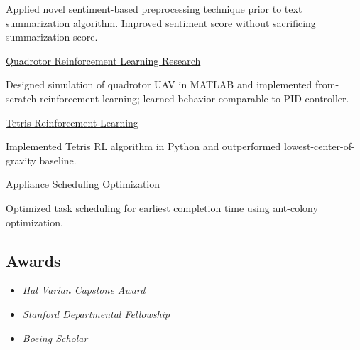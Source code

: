 \documentclass[10pt,letterpaper]{article}
\begin{document}
\begin{paracol}{2}
\begin{leftcolumn}
        \begin{adjustwidth}{2.5em}{}
        Applied novel sentiment-based preprocessing technique prior to text summarization algorithm. Improved sentiment score without sacrificing summarization score.
        \end{adjustwidth}

    \href{https://github.com/mpaluta/Quadrotor-PILCO/blob/QuadrotorPILCO/Quadrotor\%20Reinforcement\%20Learning\%20Research.pdf}{Quadrotor Reinforcement Learning Research}

        \begin{adjustwidth}{2.5em}{}
        Designed simulation of quadrotor UAV in MATLAB and implemented from-scratch reinforcement learning; learned behavior comparable to PID controller.
        \end{adjustwidth}

    \href{https://github.com/mpaluta/Tetris-Reinforcement-Learning/blob/master/Reinforcement\%20Learning\%20for\%20Tetris.pdf}{Tetris Reinforcement Learning}

        \begin{adjustwidth}{2.5em}{}
        Implemented Tetris RL algorithm in Python and outperformed lowest-center-of-gravity baseline.
        \end{adjustwidth}

    \href{https://github.com/mpaluta/Ant-Colony-Optimization/blob/master/Ant\%20Colony\%20Optimization.pdf}{Appliance Scheduling Optimization}

        \begin{adjustwidth}{2.5em}{}
        Optimized task scheduling for earliest completion time using ant-colony optimization.
        \end{adjustwidth}

\end{leftcolumn}
\begin{rightcolumn}

\subsection*{Awards}

    \begin{itemize}[label={--}, leftmargin={.15in}, rightmargin={.2in}]
    	\parskip=0.1em

    	\item
    		\emph{Hal Varian Capstone Award}
    	\item
    		\emph{Stanford Departmental Fellowship}
    	\item
    		\emph{Boeing Scholar}


\end{itemize}
\end{rightcolumn}
\end{paracol}
\end{document}
